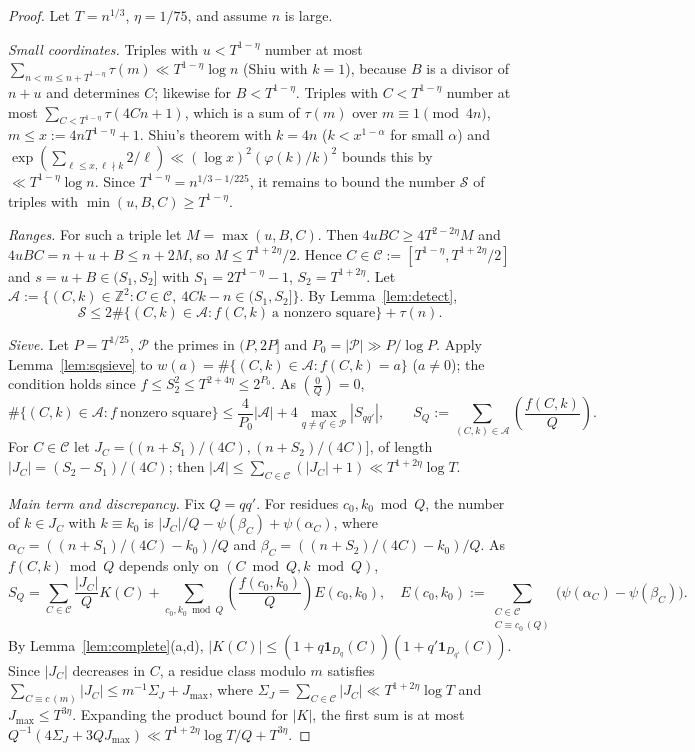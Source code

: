 \documentclass[11pt,reqno]{amsart}
\theoremstyle{definition}
\newcommand{\Z}{\mathbb Z}
\newcommand{\leg}[2]{\left(\frac{#1}{#2}\right)}
\newcommand{\cA}{\mathcal A}
\newcommand{\cC}{\mathcal C}
\newcommand{\cP}{\mathcal P}
\newcommand{\cS}{\mathcal S}
\begin{document}
\begin{proof}
Let $T=n^{1/3}$, $\eta=1/75$, and assume $n$ is large.

\emph{Small coordinates.}  Triples with $u<T^{1-\eta}$ number at most
$\sum_{n<m\le n+T^{1-\eta}}\tau(m)\ll T^{1-\eta}\log n$ (Shiu with $k=1$),
because $B$ is a divisor of $n+u$ and determines $C$; likewise for
$B<T^{1-\eta}$.  Triples with $C<T^{1-\eta}$ number at most
$\sum_{C<T^{1-\eta}}\tau(4Cn+1)$, which is a sum of $\tau(m)$ over
$m\equiv1\pmod{4n}$, $m\le x:=4nT^{1-\eta}+1$.  Shiu's theorem with $k=4n$
($k<x^{1-\alpha}$ for small $\alpha$) and
$\exp(\sum_{\ell\le x,\ell\nmid k}2/\ell)\ll(\log x)^2(\varphi(k)/k)^2$
bounds this by $\ll T^{1-\eta}\log n$.  Since $T^{1-\eta}=n^{1/3-1/225}$,
it remains to bound the number $\cS$ of triples with
$\min(u,B,C)\ge T^{1-\eta}$.

\emph{Ranges.}  For such a triple let $M=\max(u,B,C)$.  Then
$4uBC\ge4T^{2-2\eta}M$ and $4uBC=n+u+B\le n+2M$, so $M\le T^{1+2\eta}/2$.
Hence $C\in\cC:=[T^{1-\eta},T^{1+2\eta}/2]$ and $s=u+B\in(S_1,S_2]$ with
$S_1=2T^{1-\eta}-1$, $S_2=T^{1+2\eta}$.  Let
$\cA:=\{(C,k)\in\Z^2: C\in\cC,\ 4Ck-n\in(S_1,S_2]\}$.  By
Lemma~\ref{lem:detect},
\[
 \cS\le 2\#\{(C,k)\in\cA: f(C,k)\ \text{a nonzero square}\}+\tau(n).
\]

\emph{Sieve.}  Let $P=T^{1/25}$, $\cP$ the primes in $(P,2P]$ and
$P_0=|\cP|\gg P/\log P$.  Apply Lemma~\ref{lem:sqsieve} to
$w(a)=\#\{(C,k)\in\cA:f(C,k)=a\}$ ($a\ne0$); the condition holds since
$f\le S_2^2\le T^{2+4\eta}\le2^{P_0}$.  As $\leg0Q=0$,
\begin{equation}\label{eq:sieve1}
 \#\{(C,k)\in\cA:f\ \text{nonzero square}\}\le\frac4{P_0}|\cA|
 +4\max_{q\ne q'\in\cP}|S_{qq'}|,\qquad
 S_Q:=\sum_{(C,k)\in\cA}\leg{f(C,k)}{Q}.
\end{equation}
For $C\in\cC$ let $J_C=((n+S_1)/(4C),(n+S_2)/(4C)]$, of length
$|J_C|=(S_2-S_1)/(4C)$; then $|\cA|\le\sum_{C\in\cC}(|J_C|+1)\ll
T^{1+2\eta}\log T$.

\emph{Main term and discrepancy.}  Fix $Q=qq'$.  For residues
$c_0,k_0\bmod Q$, the number of $k\in J_C$ with $k\equiv k_0$ is
$|J_C|/Q-\psi(\beta_C)+\psi(\alpha_C)$, where
$\alpha_C=((n+S_1)/(4C)-k_0)/Q$ and $\beta_C=((n+S_2)/(4C)-k_0)/Q$.  As
$f(C,k)\bmod Q$ depends only on $(C\bmod Q,k\bmod Q)$,
\[
 S_Q=\sum_{C\in\cC}\frac{|J_C|}{Q}K(C)+\sum_{c_0,k_0\bmod Q}
 \leg{f(c_0,k_0)}{Q}E(c_0,k_0),\quad
 E(c_0,k_0):=\sum_{\substack{C\in\cC\\ C\equiv c_0\,(Q)}}
 \bigl(\psi(\alpha_C)-\psi(\beta_C)\bigr).
\]
By Lemma~\ref{lem:complete}(a,d),
$|K(C)|\le(1+q\mathbf 1_{D_q}(C))(1+q'\mathbf 1_{D_{q'}}(C))$.  Since
$|J_C|$ decreases in $C$, a residue class modulo $m$ satisfies
$\sum_{C\equiv c\,(m)}|J_C|\le m^{-1}\Sigma_J+J_{\max}$, where
$\Sigma_J=\sum_{C\in\cC}|J_C|\ll T^{1+2\eta}\log T$ and
$J_{\max}\le T^{3\eta}$.  Expanding the product bound for $|K|$, the first
sum is at most $Q^{-1}(4\Sigma_J+3QJ_{\max})\ll
T^{1+2\eta}\log T/Q+T^{3\eta}$.


\end{proof}
\end{document}

